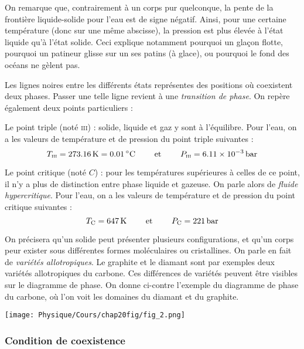 \documentclass[a4paper,french,bookmarks]{article}
\begin{document}
\text{}\medskip

On remarque que, contrairement à un corps pur quelconque, la pente de la frontière liquide-solide pour l'eau est de signe négatif. Ainsi, pour une certaine température (donc sur une même abscisse), la pression est plus élevée à l'état liquide qu'à l'état solide. Ceci explique notamment pourquoi un glaçon flotte, pourquoi un patineur glisse sur un ses patins (à glace), ou pourquoi le fond des océans ne gèlent pas.

Les lignes noires entre les différents états représentes des positions où coexistent deux phases. Passer une telle ligne revient à une \textit{transition de phase}. On repère également deux points particuliers :
%
\begin{enumerate}
    \itt Le point triple (noté {\color{main10} \textsc{iii}}) : solide, liquide et gaz y sont à l'équilibre. Pour l'eau, on a les valeurs de température et de pression du point triple suivantes :
    \[ T_\textsc{iii} = \SI{273.16}{\kelvin} = \SI{0.01}{\celsius} \qquad\ \text{et} \ \qquad P_\textsc{iii} = \SI{6.11e-3}{\bar}\]
    
    \itt Le point critique (noté $C$) : pour les températures supérieures à celles de ce point, il n'y a plus de distinction entre phase liquide et gazeuse. On parle alors de \textit{fluide hypercritique}. Pour l'eau, on a les valeurs de température et de pression du point critique suivantes :
    \[ T_\text{C} = \SI{647}{\kelvin} \qquad\ \text{et} \ \qquad P_\text{C} = \SI{221}{\bar}\]
\end{enumerate}

\begin{minipage}{0.48\linewidth}
    On précisera qu'un solide peut présenter plusieurs configurations, et qu'un corps peur exister sous différentes formes moléculaires ou cristallines. On parle en fait de \textit{variétés allotropiques}. Le graphite et le diamant sont par exemples deux variétés allotropiques du carbone. Ces différences de variétés peuvent être visibles sur le diagramme de phase. On donne ci-contre l'exemple du diagramme de phase du carbone, où l'on voit les domaines du diamant et du graphite.
\end{minipage}
%
\hfill
%
\begin{minipage}{0.48\linewidth}
    \centering
    \texttt{[image: Physique/Cours/chap20fig/fig\_2.png]}
\end{minipage}

\subsubsection{Condition de coexistence}
\end{document}
